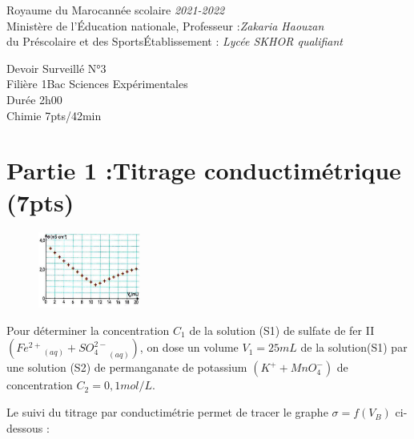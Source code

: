 \documentclass[12pt]{article}
\newcommand\headerMe[2]{\noindent{}#1\hfill#2}
\begin{document}
\headerMe{Royaume du Maroc}{année scolaire \emph{2021-2022}}\\
\headerMe{Ministère de l'Éducation nationale, }{  Professeur :\emph{Zakaria Haouzan}}\\
\headerMe{du Préscolaire et des Sports}{Établissement : \emph{Lycée SKHOR qualifiant}}\\

\begin{center}
Devoir Surveillé  N°3 \\
    Filière 1Bac Sciences Expérimentales\\
Durée 2h00
\\
    \vspace{.2cm}
\hrulefill
\Large{Chimie 7pts/42min}
\hrulefill\\

\end{center}

 \section*{Partie 1 :Titrage conductimétrique \dotfill(7pts) }

\begin{figure}
  \begin{center}
    \vspace{-1cm}
    \includegraphics[width=0.3\textwidth]{./img/Screenshot from 2022-05-11 17-55-37.png}
  \end{center}
\end{figure}
Pour déterminer la concentration $C_1$ de la solution (S1) de sulfate de fer II $({Fe^{2+}}_{(aq)} + {SO_4^{2-}}_{(aq)})$, on dose un volume $V_1=25 mL$ de la solution(S1) par une solution (S2) de permanganate de potassium $(K^+ + MnO_4^-)$ de concentration $C_2=0,1 mol/L.$
 
 Le suivi du titrage par conductimétrie permet de tracer le graphe $\sigma = f(V_B)$ ci-dessous :
\end{document}
